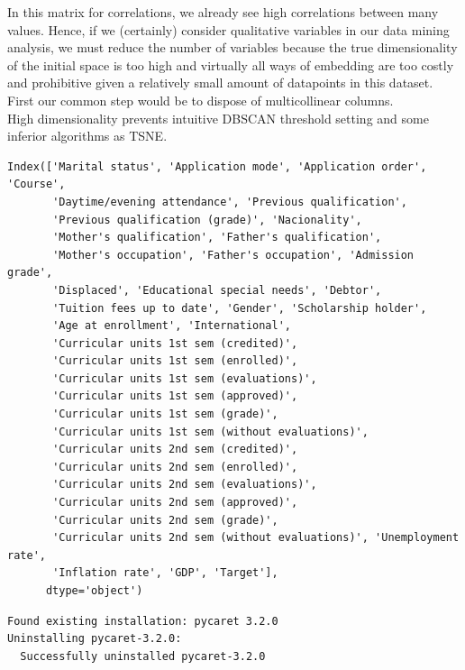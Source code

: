 \documentclass[
  letterpaper,
  DIV=11,
  numbers=noendperiod]{scrartcl}
\begin{document}
In this matrix for correlations, we already see high correlations
between many values. Hence, if we (certainly) consider qualitative
variables in our data mining analysis, we must reduce the number of
variables because the true dimensionality of the initial space is too
high and virtually all ways of embedding are too costly and prohibitive
given a relatively small amount of datapoints in this dataset. First our
common step would be to dispose of multicollinear columns.\\
High dimensionality prevents intuitive DBSCAN threshold setting and some
inferior algorithms as TSNE.

\begin{verbatim}
Index(['Marital status', 'Application mode', 'Application order', 'Course',
       'Daytime/evening attendance', 'Previous qualification',
       'Previous qualification (grade)', 'Nacionality',
       'Mother's qualification', 'Father's qualification',
       'Mother's occupation', 'Father's occupation', 'Admission grade',
       'Displaced', 'Educational special needs', 'Debtor',
       'Tuition fees up to date', 'Gender', 'Scholarship holder',
       'Age at enrollment', 'International',
       'Curricular units 1st sem (credited)',
       'Curricular units 1st sem (enrolled)',
       'Curricular units 1st sem (evaluations)',
       'Curricular units 1st sem (approved)',
       'Curricular units 1st sem (grade)',
       'Curricular units 1st sem (without evaluations)',
       'Curricular units 2nd sem (credited)',
       'Curricular units 2nd sem (enrolled)',
       'Curricular units 2nd sem (evaluations)',
       'Curricular units 2nd sem (approved)',
       'Curricular units 2nd sem (grade)',
       'Curricular units 2nd sem (without evaluations)', 'Unemployment rate',
       'Inflation rate', 'GDP', 'Target'],
      dtype='object')
\end{verbatim}

\begin{verbatim}
Found existing installation: pycaret 3.2.0
Uninstalling pycaret-3.2.0:
  Successfully uninstalled pycaret-3.2.0
\end{verbatim}
\end{document}
